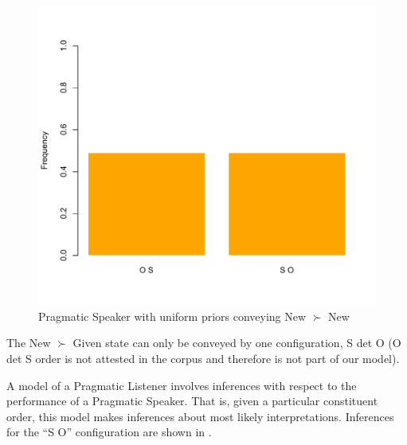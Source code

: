 \documentclass[output=paper,modfonts,nonflat]{langsci/langscibook}
\begin{document}
\begin{figure}
\includegraphics[scale = 0.45]{figures/plotPragmaticSpeakerNewNewUniform}
\caption{Pragmatic Speaker with uniform priors conveying New $\succ$ New}\label{figure:uniform4}
\end{figure}

The New $\succ$ Given state can only be conveyed by one configuration, S {\sc det} O (O {\sc det} S order is not attested in the corpus and therefore is not part of our model).

A model of a Pragmatic Listener involves inferences with respect to the performance of a Pragmatic Speaker. That is, given a particular constituent order, this model makes inferences about most likely interpretations. Inferences for the ``S O'' configuration are shown in  .
\end{document}
